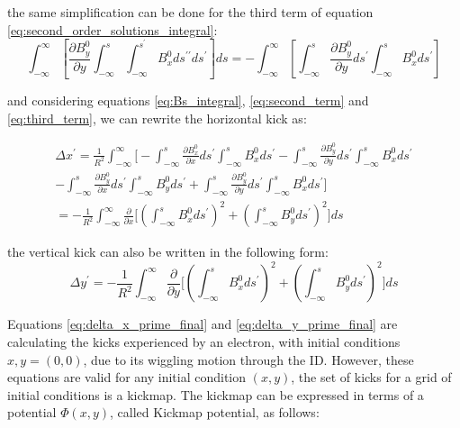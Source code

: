 \documentclass[a4paper,12pt]{article}
\begin{document}
the same simplification can be done for the third term of equation \eqref{eq:second_order_solutions_integral}:
\begin{equation}
    \int_{-\infty}^{\infty}\left[\frac{\partial B_y^{0}}{\partial y}\int_{-\infty}^{s}\int_{-\infty}^{s^{\prime}}B_{x}^{0}ds^{\prime \prime}
    ds^{\prime}\right]ds = -\int_{-\infty}^{\infty}\left[\int_{-\infty}^{s}\frac{\partial B_y^{0}}{\partial y}ds^{\prime}
    \int_{-\infty}^{s}B_x^{0}ds^{\prime}\right]
    \label{eq:third_term}
\end{equation}

and considering equations \eqref{eq:Bs_integral}, \eqref{eq:second_term} and \eqref{eq:third_term}, we can rewrite the horizontal kick as:

\begin{equation}
    \begin{aligned}
        \Delta x^{\prime} = \frac{1}{R^2}\int_{-\infty}^{\infty}
        \Bigg[
            -\int_{-\infty}^{s}\frac{\partial B_x^{0}}{\partial x}ds^{\prime}
            \int_{-\infty}^{s}B_x^{0}ds^{\prime} 
            -\int_{-\infty}^{s}\frac{\partial B_y^{0}}{\partial y}ds^{\prime}
            \int_{-\infty}^{s}B_x^{0}ds^{\prime} \\
            -\int_{-\infty}^{s}\frac{\partial B_y^{0}}{\partial x}ds^{\prime}
            \int_{-\infty}^{s}B_y^{0}ds^{\prime} 
            +\int_{-\infty}^{s}\frac{\partial B_y^{0}}{\partial y}ds^{\prime}
            \int_{-\infty}^{s}B_x^{0}ds^{\prime} \Bigg] \\
        = - \frac{1}{R^2}\int_{-\infty}^{\infty}\frac{\partial}{\partial x}\Bigg[\left(\int_{-\infty}^{s}B_x^{0}ds^{\prime}\right)^2 +
        \left(\int_{-\infty}^{s}B_y^{0}ds^{\prime}\right)^2 \Bigg]ds
        \end{aligned}
        \label{eq:delta_x_prime_final}
\end{equation}

the vertical kick can also be written in the following form:
\begin{equation}
    \Delta y^{\prime} = - \frac{1}{R^2}\int_{-\infty}^{\infty}\frac{\partial}{\partial y}\Bigg[\left(\int_{-\infty}^{s}B_x^{0}ds^{\prime}\right)^2 +
        \left(\int_{-\infty}^{s}B_y^{0}ds^{\prime}\right)^2 \Bigg]ds
    \label{eq:delta_y_prime_final}
\end{equation}

Equations \eqref{eq:delta_x_prime_final} and \eqref{eq:delta_y_prime_final} are calculating the kicks experienced by an electron, with initial conditions $x, y = (0, 0)$, due
 to its wiggling motion through the ID. However, these equations are valid for any initial condition $(x, y)$,
 the set of kicks for a grid of initial conditions is a kickmap. The kickmap
can be expressed in terms of a potential $\Phi(x, y)$, called Kickmap potential, as follows:
\end{document}
